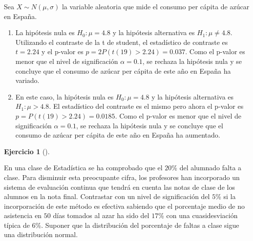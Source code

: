 \documentclass[
  spanish,
  a4paper,
]{scrreport}
\theoremstyle{definition}
\newtheorem{exercise}{Ejercicio}[chapter]
\theoremstyle{remark}
\begin{document}
\begin{tcolorbox}[enhanced jigsaw, arc=.35mm, bottomrule=.15mm, bottomtitle=1mm, breakable, colback=white, colbacktitle=quarto-callout-tip-color!10!white, colframe=quarto-callout-tip-color-frame, coltitle=black, left=2mm, leftrule=.75mm, opacityback=0, opacitybacktitle=0.6, rightrule=.15mm, title=\textcolor{quarto-callout-tip-color}{\faLightbulb}\hspace{0.5em}{Solución}, titlerule=0mm, toprule=.15mm, toptitle=1mm]

Sea \(X\sim N(\mu,\sigma)\) la variable aleatoria que mide el consumo
per cápita de azúcar en España.

\begin{enumerate}
\def\labelenumi{\alph{enumi}.}
\item
  La hipótesis nula es \(H_0: \mu=4.8\) y la hipótesis alternativa es
  \(H_1: \mu\neq 4.8\). Utilizando el contraste de la t de student, el
  estadístico de contraste es \(t=2.24\) y el p-valor es
  \(p =2 P(t(19)>2.24) = 0.037\). Como el p-valor es menor que el nivel
  de significación \(\alpha = 0.1\), se rechaza la hipótesis nula y se
  concluye que el consumo de azúcar per cápita de este año en España ha
  variado.
\item
  En este caso, la hipótesis nula es \(H_0: \mu=4.8\) y la hipótesis
  alternativa es \(H_1: \mu> 4.8\). El estadístico del contraste es el
  mismo pero ahora el p-valor es \(p = P(t(19)>2.24) = 0.0185\). Como el
  p-valor es menor que el nivel de significación \(\alpha = 0.1\), se
  rechaza la hipótesis nula y se concluye que el consumo de azúcar per
  cápita de este año en España ha aumentado.
\end{enumerate}

\end{tcolorbox}

\begin{exercise}[]\protect\hypertarget{exr-contraste-proporcion-asistencia-clase}{}\label{exr-contraste-proporcion-asistencia-clase}

En una clase de Estadística se ha comprobado que el \(20\)\% del
alumnado falta a clase. Para disminuir esta preocupante cifra, los
profesores han incorporado un sistema de evaluación continua que tendrá
en cuenta las notas de clase de los alumnos en la nota final. Contrastar
con un nivel de significación del \(5\)\% si la incorporación de este
método es efectiva sabiendo que el porcentaje medio de no asistencia en
\(50\) días tomados al azar ha sido del \(17\)\% con una cuasidesviación
típica de \(6\)\%. Suponer que la distribución del porcentaje de faltas
a clase sigue una distribución normal.

\end{exercise}
\end{document}
